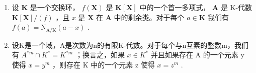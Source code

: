 \BourbakiExerciseGroup

\begin{enumerate}
\def\labelenumi{\arabic{enumi})}
\item
  设 \(\mathbf{K}\) 是一个交换环， \(f(\mathbf{X})\) 是 \(\mathbf{K}[\mathbf{X}]\) 中的一个首一多项式， \(\mathbf{A}\) 是 K-代数 \(\mathbf{K}[\mathbf{X}] / (f)\) ，且 \(x\) 是 \(\mathbf{X}\) 在 \(\mathbf{A}\) 中的剩余类。对于每个 \(a \in \mathbf{K}\) 我们有 \(f(a) = \mathrm{N}_{\mathrm{A} / \mathrm{K}}(a - x)\) .
\item
  设K是一个域，A是次数为n的有限K-代数。对于每个与n互素的整数m，我们有 \(A^{*m} \cap K^{*} = K^{*m}\) ；换言之，如果 \(x \in K^{*}\) 并且如果存在 A 的一个元素 y 使得 \(x = y^{m}\) ，则存在 K 中的一个元素 z 使得 \(x = z^{m}\) .
\end{enumerate}

